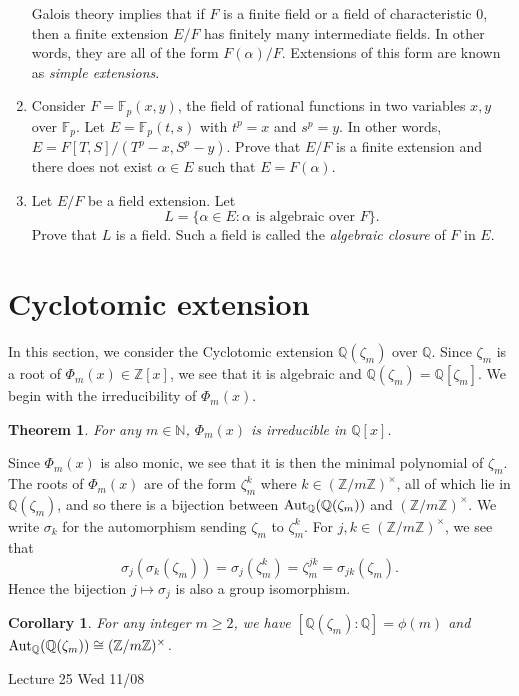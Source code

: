 \documentclass{article}
\def\Z{{\mathbb Z}}
\def\Aut{{\rm Aut}}
\def\F{{\mathbb F}}
\def\N{{\mathbb N}}
\def\Q{{\mathbb Q}}
\def\Z{{\mathbb Z}}
\def\F{{\mathbb F}}
\def\Q{{\mathbb Q}}
\newtheorem{theorem}[subsection]{Theorem}
\newtheorem{cor}[subsection]{Corollary}
\newcommand{\add}[1]{{\color{blue} #1}}
\begin{document}
\begin{enumerate}[\thesection .1]
    Galois theory implies that if $F$ is a finite field or a field of characteristic $0$, then a finite extension $E/F$ has finitely many intermediate fields. In other words, they are all of the form $F(\alpha)/F$. Extensions of this form are known as \textit{simple extensions}.
    \item Consider $F = \F_p(x,y)$, the field of rational functions in two variables $x,y$ over $\F_p$. Let $E = \F_p(t,s)$ with $t^p = x$ and $s^p = y$. In other words, $E = F[T,S]/(T^p - x, S^p - y).$ Prove that $E/F$ is a finite extension and there does not exist $\alpha\in E$ such that $E = F(\alpha)$.
    \item Let $E/F$ be a field extension. Let $$L=\{\alpha\in E\colon \alpha\mbox{ is algebraic over }F\}.$$
    Prove that $L$ is a field. Such a field is called the \textit{algebraic closure} of $F$ in $E$. 
\end{enumerate}




\section{Cyclotomic extension}
In this section, we consider the Cyclotomic extension $\Q(\zeta_m)$ over $\Q$. Since $\zeta_m$ is a root of $\Phi_m(x)\in\Z[x]$, we see that it is algebraic and $\Q(\zeta_m) = \Q[\zeta_m]$. We begin with the irreducibility of $\Phi_m(x)$.

\begin{theorem}
    For any $m\in\N$, $\Phi_m(x)$ is irreducible in $\Q[x]$.
\end{theorem}

Since $\Phi_m(x)$ is also monic, we see that it is then the minimal polynomial of $\zeta_m$. The roots of $\Phi_m(x)$ are of the form $\zeta_m^k$ where $k\in(\Z/m\Z)^\times$, all of which lie in $\Q(\zeta_m)$, and so there is a bijection between $\Aut_\Q(\Q(\zeta_m))$ and $(\Z/m\Z)^\times.$ We write $\sigma_k$ for the automorphism sending $\zeta_m$ to $\zeta_m^k$. For $j,k\in(\Z/m\Z)^\times$, we see that $$\sigma_j(\sigma_k(\zeta_m)) = \sigma_j(\zeta_m^k) = \zeta_m^{jk} = \sigma_{jk}(\zeta_m).$$
Hence the bijection $j\mapsto \sigma_j$ is also a group isomorphism.

\begin{cor}
    For any integer $m\geq 2$, we have $[\Q(\zeta_m):\Q] = \phi(m)$ and $\Aut_\Q(\Q(\zeta_m)) \cong (\Z/m\Z)^\times$.
\end{cor}

\begin{center}
    \add{Lecture 25 Wed 11/08}
\end{center}
\end{document}
